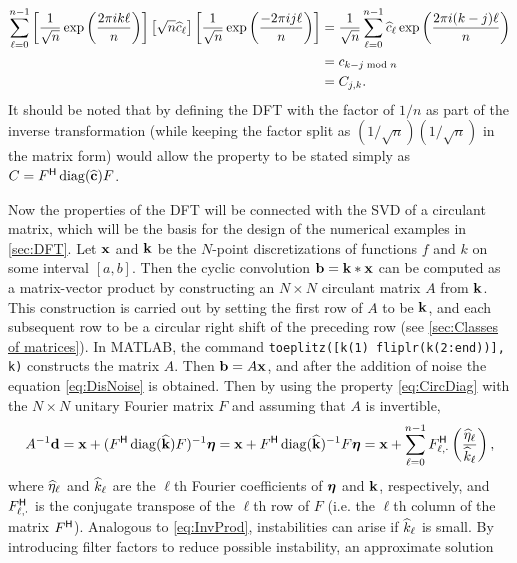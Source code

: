 \begin{align*}
\sum_{\ell=0}^{n-1} \left[\frac{1}{\sqrt{n}}  \exp\left(\frac{2\pi{i}k\ell}{n}\right)\right] \left[\sqrt{n}\widehat{c}_\ell\right] \left[\frac{1}{\sqrt{n}} \exp\left(\frac{-2\pi{i}j\ell}{n}\right)\right] &= \frac{1}{\sqrt{n}} \sum_{\ell=0}^{n-1} \widehat{c}_\ell \exp\left(\frac{2\pi{i}(k-j)\ell}{n}\right) \\
&= c_{k-j \bmod n} \\
&= C_{j,k}.
\end{align*}
It should be noted that by defining the DFT with the factor of $1/n$ as part of the inverse transformation (while keeping the factor split as $(1/\sqrt{n})(1/\sqrt{n})$ in the matrix form) would allow the property to be stated simply as $C = {F}^\mathsf{H}\operatorname{diag}(\widehat{\mathbf{c}})F$. \par 
Now the properties of the DFT will be connected with the SVD of a circulant matrix, which will be the basis for the design of the numerical examples in \ref{sec:DFT}. Let $\mathbf{x}$ and $\mathbf{k}$ be the $N$-point discretizations of functions $f$ and $k$ on some interval $[a,b]$. Then the cyclic convolution $\mathbf{b} = \mathbf{k} * \mathbf{x}$ can be computed as a matrix-vector product by constructing an $N \times N$ circulant matrix $A$ from $\mathbf{k}$. This construction is carried out by setting the first row of $A$ to be $\mathbf{k}$, and each subsequent row to be a circular right shift of the preceding row (see \ref{sec:Classes of matrices}). In MATLAB, the command \texttt{toeplitz([k(1) fliplr(k(2:end))], k)} constructs the matrix $A$. Then $\mathbf{b} = A\mathbf{x}$, and after the addition of noise the equation \eqref{eq:DisNoise} is obtained. Then by using the property \eqref{eq:CircDiag} with the $N \times N$ unitary Fourier matrix $F$ and assuming that $A$ is invertible, 
\begin{equation}
{A}^{-1}\mathbf{d} = \mathbf{x} + ({F}^\mathsf{H}\operatorname{diag}(\widehat{\mathbf{k}})F)^{-1}\bm{\eta} = \mathbf{x} + {F}^\mathsf{H}\operatorname{diag}(\widehat{\mathbf{k}})^{-1}F\bm{\eta} = \mathbf{x} + \sum_{\ell = 0}^{n-1} {F}^\mathsf{H}_{\ell,\cdot}\left(\frac{\widehat{\eta}_\ell}{\widehat{k}_\ell}\right),
\label{eq:InvProdDFT}
\end{equation}
where $\widehat{\eta}_\ell$ and $\widehat{k}_\ell$ are the $\ell$th Fourier coefficients of $\bm{\eta}$ and $\mathbf{k}$, respectively, and ${F}^\mathsf{H}_{\ell,\cdot}$ is the conjugate transpose of the $\ell$th row of $F$ (i.e. the $\ell$th column of the matrix ${F}^\mathsf{H}$). Analogous to \eqref{eq:InvProd}, instabilities can arise if $\widehat{k}_\ell$ is small. By introducing filter factors to reduce possible instability, an approximate solution
